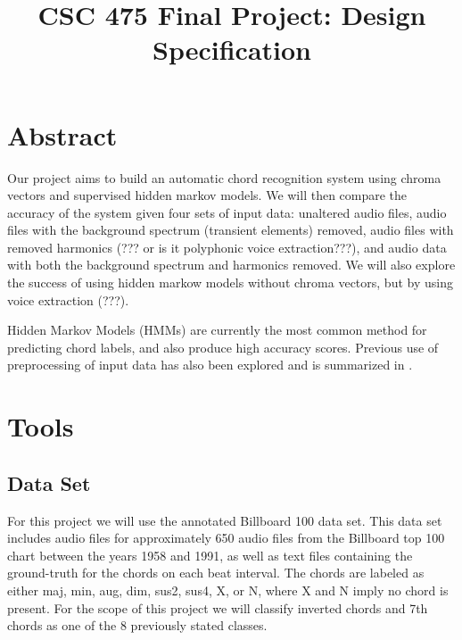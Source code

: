 \documentclass{article}
\title{CSC 475 Final Project: Design Specification}
\begin{document}
%
\maketitle
%

\section{Abstract}\label{sec:desoutline}
Our project aims to build an automatic chord recognition system using chroma vectors and supervised hidden markov 
models. We will then compare the accuracy of the system given four sets of input data: unaltered audio files, audio 
files with the background spectrum (transient elements) removed, audio files with removed harmonics (??? or is it 
polyphonic voice extraction???), and audio data with both the background spectrum and harmonics removed. We will 
also explore the success of using hidden markow models without chroma vectors, but by using voice extraction (???).

Hidden Markov Models (HMMs) are currently the most common method for predicting chord labels, and also 
produce high accuracy scores. Previous use of preprocessing of input data has also been explored and is
summarized in \cite{McVicar:00}.

\section{Tools}\label{sec:tools}

\subsection{Data Set}

For this project we will use the annotated Billboard 100 data set. This data set includes audio files for 
approximately 650 audio files from the Billboard top 100 chart between the years 1958 and 1991, as well as text
files containing the ground-truth for the chords on each beat interval\cite{Burgoyne:07}. The chords are labeled
as either maj, min, aug, dim, sus2, sus4, X, or N, where X and N imply no chord is present. For the scope of this
project we will classify inverted chords and 7th chords as one of the 8 previously stated classes.
\end{document}
